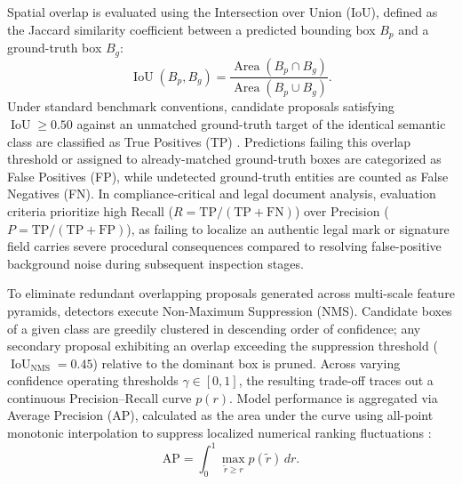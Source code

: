 Spatial overlap is evaluated using the Intersection over Union (IoU), defined as the Jaccard similarity coefficient between a predicted bounding box $B_p$ and a ground-truth box $B_g$:
\begin{equation}
\label{eq:theory_iou}
\operatorname{IoU}(B_p, B_g) = \frac{\operatorname{Area}(B_p \cap B_g)}{\operatorname{Area}(B_p \cup B_g)}.
\end{equation}
Under standard benchmark conventions, candidate proposals satisfying $\operatorname{IoU} \ge 0.50$ against an unmatched ground-truth target of the identical semantic class are classified as True Positives (TP) \cite{docxa1}.
Predictions failing this overlap threshold or assigned to already-matched ground-truth boxes are categorized as False Positives (FP), while undetected ground-truth entities are counted as False Negatives (FN).
In compliance-critical and legal document analysis, evaluation criteria prioritize high Recall ($R = \mathrm{TP}/(\mathrm{TP}+\mathrm{FN})$) over Precision ($P = \mathrm{TP}/(\mathrm{TP}+\mathrm{FP})$), as failing to localize an authentic legal mark or signature field carries severe procedural consequences compared to resolving false-positive background noise during subsequent inspection stages.

To eliminate redundant overlapping proposals generated across multi-scale feature pyramids, detectors execute Non-Maximum Suppression (NMS).
Candidate boxes of a given class are greedily clustered in descending order of confidence; any secondary proposal exhibiting an overlap exceeding the suppression threshold ($\operatorname{IoU}_{\text{NMS}} = 0.45$) relative to the dominant box is pruned.
Across varying confidence operating thresholds $\gamma \in [0, 1]$, the resulting trade-off traces out a continuous Precision--Recall curve $p(r)$.
Model performance is aggregated via Average Precision (AP), calculated as the area under the curve using all-point monotonic interpolation to suppress localized numerical ranking fluctuations \cite{docxa1}:
\begin{equation}
\label{eq:theory_average_precision}
\mathrm{AP} = \int_0^1 \max_{\tilde{r} \ge r} p(\tilde{r}) \, dr.
\end{equation}


